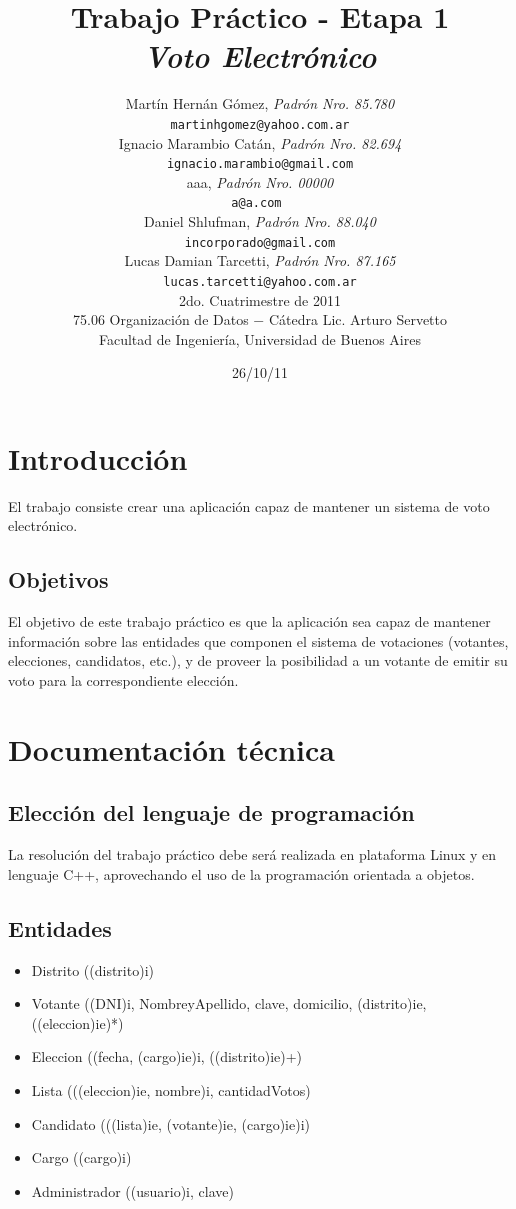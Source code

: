 \documentclass[a4paper,10pt]{article}
\title{		\textbf{Trabajo Práctico - Etapa 1 \\ \textit{Voto Electrónico}} }
\author{	Martín Hernán Gómez, \textit{Padrón Nro. 85.780}                     \\
            \texttt{martinhgomez@yahoo.com.ar}                                              \\[2.5ex]
            Ignacio Marambio Catán, \textit{Padrón Nro. 82.694}                     \\
            \texttt{ignacio.marambio@gmail.com}                                             \\[2.5ex]
            aaa, \textit{Padrón Nro. 00000}                     \\
            \texttt{a@a.com }                                              \\[2.5ex]
            Daniel Shlufman, \textit{Padrón Nro. 88.040}                     \\
            \texttt{incorporado@gmail.com}                                              \\[2.5ex]
            Lucas Damian Tarcetti, \textit{Padrón Nro. 87.165}                     \\
            \texttt{lucas.tarcetti@yahoo.com.ar}                                              \\[2.5ex]
            \normalsize{2do. Cuatrimestre de 2011}                                      \\
            \normalsize{75.06 Organización de Datos $-$ Cátedra Lic. Arturo Servetto}  \\
            \normalsize{Facultad de Ingeniería, Universidad de Buenos Aires}            \\
       }
\date{26/10/11}
\begin{document}
\maketitle
\thispagestyle{empty}   %
\newpage

\tableofcontents
\newpage


\pagestyle{fancy} %
\section{Introducción}

El trabajo consiste crear una aplicación capaz de mantener un sistema de voto electrónico.

\subsection{Objetivos}

El objetivo de este trabajo práctico es que la aplicación sea capaz de mantener información sobre las entidades que componen el sistema de votaciones (votantes, elecciones, candidatos, etc.), y de proveer la posibilidad a un votante de emitir su voto para la correspondiente elección.


\section{Documentación técnica}


\subsection{Elección del lenguaje de programación}
La resolución del trabajo práctico debe será realizada en plataforma Linux y en lenguaje C++, aprovechando el uso de la programación orientada a objetos.

\subsection{Entidades}

\begin{itemize}
\item Distrito ((distrito)i)
\item Votante ((DNI)i, NombreyApellido, clave, domicilio, (distrito)ie, ((eleccion)ie)*)
\item Eleccion ((fecha, (cargo)ie)i, ((distrito)ie)+)
\item Lista (((eleccion)ie, nombre)i, cantidadVotos)
\item Candidato (((lista)ie, (votante)ie, (cargo)ie)i)
\item Cargo ((cargo)i)
\item Administrador ((usuario)i, clave)
\end{itemize}
\end{document}

